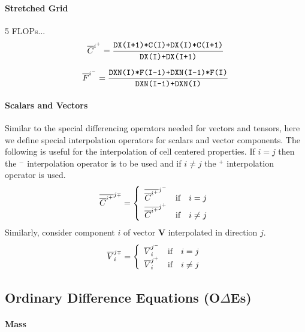 \documentclass[11pt]{article}
\begin{document}
\paragraph{Stretched Grid} 5 FLOPs...
\begin{equation}
\label{eqn_lever_rule}
\overline{C}^{i^+} = \frac{\mbox{\tt DX(I+1)*C(I)+DX(I)*C(I+1)}}{\mbox{\tt DX(I)+DX(I+1)}}
\end{equation}

\begin{equation}
\label{eqn_lever_rule}
\overline{F}^{i^-} = \frac{\mbox{\tt DXN(I)*F(I-1)+DXN(I-1)*F(I)}}{\mbox{\tt DXN(I-1)+DXN(I)}}
\end{equation}

\paragraph{Scalars and Vectors} Similar to the special differencing operators needed for vectors and tensors, here we define special interpolation operators for scalars and vector components. The following is useful for the interpolation of cell centered properties. If $i=j$ then the $^-$ interpolation operator is to be used and if $i\ne j$ the $^+$ interpolation operator is used.
\begin{equation}
\overline{\overline{C}^{i^{\scriptscriptstyle +}}}^{j{\scriptscriptstyle \mp}} = \left\{ \begin{array}{ll} \overline{\overline{C}^{i^{\scriptscriptstyle +}}}^{j^-} & \mbox{if} \quad i=j \\ \overline{\overline{C}^{i^{\scriptscriptstyle +}}}^{j^+} & \mbox{if} \quad i\ne j \end{array} \right.
\end{equation}
Similarly, consider component $i$ of vector $\mathbf{V}$ interpolated in direction $j$.  
\begin{equation}
\overline{V}_i^{j{\scriptscriptstyle \mp}} = \left\{ \begin{array}{ll} \overline{V}_i^{j^{\scriptscriptstyle -}} & \mbox{if} \quad i=j \\ \overline{V}_i^{j^{\scriptscriptstyle +}} & \mbox{if} \quad i\ne j \end{array} \right.
\end{equation}


\subsection{Ordinary Difference Equations (O$\Delta$Es)}

\paragraph{Mass}
\end{document}
